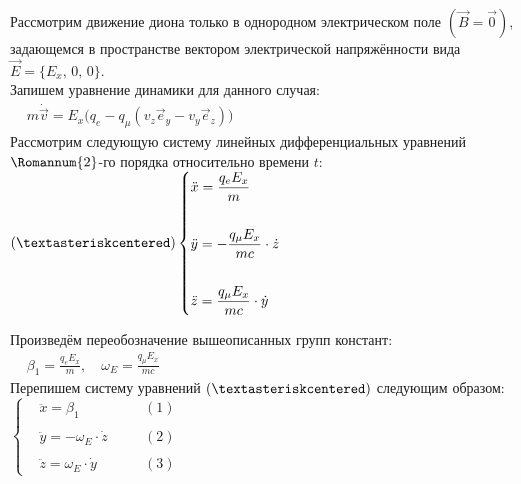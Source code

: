 \documentclass[oneside,final,14pt]{extarticle}
\begin{document}
		\noindent Рассмотрим движение диона только в однородном электрическом поле $(\vec{B} = \vec{0})$, задающемся в пространстве вектором электрической напряжённости вида $\vec{E} = \{E_{x},\, 0,\, 0\}$. \\
		
		\noindent Запишем уравнение динамики для данного случая: \\
		
		\begin{math}
			\begin{aligned}
				& m\dot{\vec{v}} = E_{x}\Big(q_{e} - q_{\mu}\left(v_{z}\vec{e}_{y} - v_{y}\vec{e}_{z}\right)\Big)
			\end{aligned}
		\end{math} \\
		
		\noindent Рассмотрим следующую систему линейных дифференциальных уравнений $\Romannum{2}$-го порядка относительно времени $t$: \\
		
		\begin{math}
			(\textasteriskcentered) \left\{
			\begin{aligned}
				& \ddot{x} = \frac{q_{e}E_{x}}{m} \\\\
				& \ddot{y} = -\frac{q_{\mu}E_{x}}{mc} \cdot \dot{z} \\\\
				& \ddot{z} = \frac{q_{\mu}E_{x}}{mc} \cdot \dot{y}
			\end{aligned}
			\right.
		\end{math}
		
		\newpage
		\noindent Произведём переобозначение вышеописанных групп констант: \\
		
		\begin{math}
			\begin{aligned}
				& \beta_{1} = \frac{q_{e}E_{x}}{m}, \quad \omega_{E} = \frac{q_{\mu}E_{x}}{mc}
			\end{aligned}
		\end{math} \\
		
		\noindent Перепишем систему уравнений $(\textasteriskcentered)$ следующим образом: \\
		
		\begin{math}
			\left\{
			\begin{aligned}
				& \ddot{x} = \beta_{1} \quad && (1) \\\\
				& \ddot{y} = -\omega_{E} \cdot \dot{z} \quad && (2) \\\\
				& \ddot{z} = \omega_{E} \cdot \dot{y} \quad && (3)
			\end{aligned}
			\right.
		\end{math} \\\\
		
\end{document}
